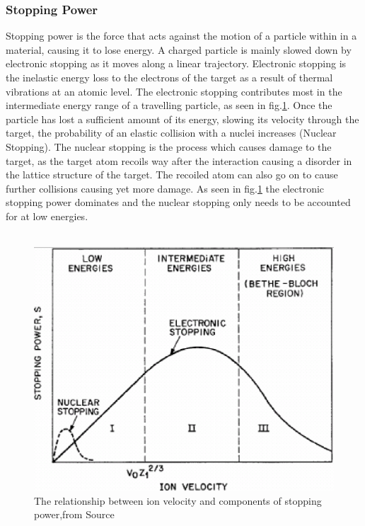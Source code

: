 \documentclass[12pt,a4paper]{article}
\begin{document}
\subsubsection{Stopping Power}
\label{stop}
Stopping power is the force that acts against the motion of a particle within in a material, causing it to lose energy. A charged particle is mainly slowed down by electronic stopping as it moves along a linear trajectory. Electronic stopping is the inelastic energy loss to the electrons of the target as a result of thermal vibrations at an atomic level. The electronic stopping contributes most in the intermediate energy range of a travelling particle, as seen in fig.\ref{stprg}. Once the particle has lost a sufficient amount of its energy, slowing its velocity through the target, the probability of an elastic collision with a nuclei increases (Nuclear Stopping). The nuclear stopping is the process which causes damage to the target, as the target atom recoils way after the interaction causing a disorder in the lattice structure of the target. The recoiled atom can also go on to cause further collisions causing yet more damage. As seen in fig.\ref{stprg} the electronic stopping power dominates and the nuclear stopping only needs to be accounted for at low energies.
\\\\
\begin{figure}[h!]
\centering
\includegraphics[scale=0.4]{Images//Stopping//stoppingrange.png}
\caption[width=\columnwidth]{The relationship between ion velocity and components of stopping power,from Source \cite{stprg}}
\label{stprg}
\end{figure}
\end{document}
